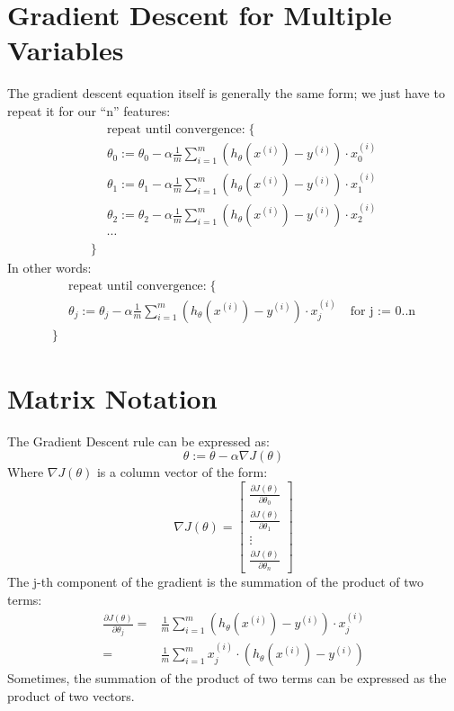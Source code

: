 \section{Gradient Descent for Multiple Variables}
The gradient descent equation itself is generally the same form; we just have to repeat it for our ``n'' features:
\begin{align*}
& \text{repeat until convergence:} \; \lbrace \\ 
\; & \theta_0 := \theta_0 - \alpha \frac{1}{m} \sum\limits_{i=1}^{m} (h_\theta(x^{(i)}) - y^{(i)}) \cdot x_0^{(i)}\\
\; & \theta_1 := \theta_1 - \alpha \frac{1}{m} \sum\limits_{i=1}^{m} (h_\theta(x^{(i)}) - y^{(i)}) \cdot x_1^{(i)} \\
\; & \theta_2 := \theta_2 - \alpha \frac{1}{m} \sum\limits_{i=1}^{m} (h_\theta(x^{(i)}) - y^{(i)}) \cdot x_2^{(i)} \\
& \cdots
\\ \rbrace
\end{align*}
In other words:
\begin{align*}
& \text{repeat until convergence:} \; \lbrace \\ 
\; & \theta_j := \theta_j - \alpha \frac{1}{m} \sum\limits_{i=1}^{m} (h_\theta(x^{(i)}) - y^{(i)}) \cdot x_j^{(i)} \;  & \text{for j := 0..n}\\ 
\rbrace
\end{align*}
\section{Matrix Notation}
The Gradient Descent rule can be expressed as:
\begin{equation}
\theta := \theta - \alpha \nabla J(\theta)
\end{equation}
Where $\nabla J(\theta)$ is a column vector of the form:
\begin{equation}
\nabla J(\theta)  = 
\begin{bmatrix}
\frac{\partial J(\theta)}{\partial \theta_0}   \\ \frac{\partial J(\theta)}{\partial \theta_1}   \\ \vdots   \\ \frac{\partial J(\theta)}{\partial \theta_n} 
\end{bmatrix}
\end{equation}
The j-th component of the gradient is the summation of the product of two terms:
\begin{align*}
\frac{\partial J(\theta)}{\partial \theta_j} =&  \frac{1}{m} \sum\limits_{i=1}^{m}  \left(h_\theta(x^{(i)}) - y^{(i)} \right) \cdot x_j^{(i)} \\
=& \frac{1}{m} \sum\limits_{i=1}^{m}   x_j^{(i)} \cdot \left(h_\theta(x^{(i)}) - y^{(i)}  \right) 
\end{align*}
Sometimes, the summation of the product of two terms can be expressed as the product of two vectors.

